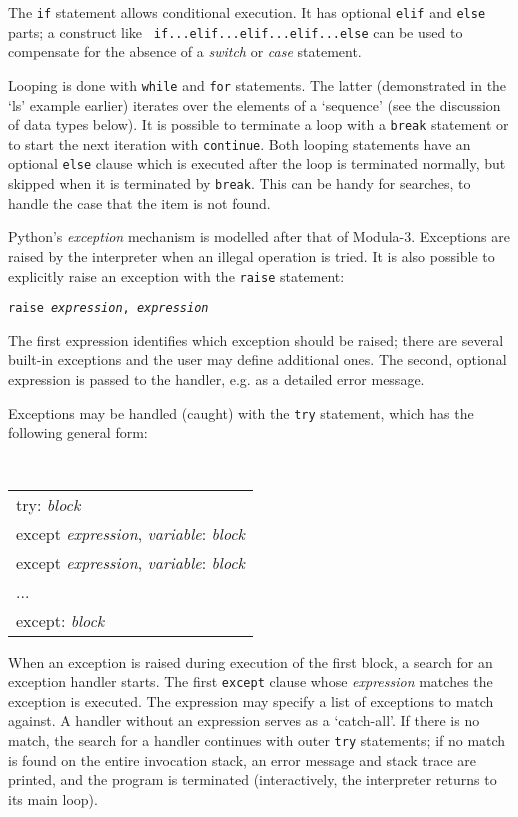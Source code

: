 The {\tt if} statement allows conditional execution.  It has optional
{\tt elif} and {\tt else} parts; a construct like {\tt
if...elif...elif...elif...else} can be used to compensate for the
absence of a {\em switch} or {\em case} statement.

Looping is done with {\tt while} and {\tt for} statements.  The latter
(demonstrated in the `ls' example earlier) iterates over the elements
of a `sequence' (see the discussion of data types below).  It is
possible to terminate a loop with a {\tt break} statement or to start
the next iteration with {\tt continue}.  Both looping statements have
an optional {\tt else} clause which is executed after the loop is
terminated normally, but skipped when it is terminated by {\tt break}.
This can be handy for searches, to handle the case that the item is
not found.

Python's {\em exception} mechanism is modelled after that of Modula-3.
Exceptions are raised by the interpreter when an illegal operation is
tried.  It is also possible to explicitly raise an exception with the
{\tt raise} statement:
\vspace{\itemsep}

\noindent
{\tt raise {\em expression}, {\em expression}}
\vspace{\itemsep}

The first expression identifies which exception should be raised;
there are several built-in exceptions and the user may define
additional ones.  The second, optional expression is passed to the
handler, e.g. as a detailed error message.

Exceptions may be handled (caught) with the {\tt try} statement, which
has the following general form:
\vspace{\itemsep}

\noindent
{\tt
\begin{tabular}{l}
try: {\em block} \\
except {\em expression}, {\em variable}: {\em block} \\
except {\em expression}, {\em variable}: {\em block} \\
... \\
except: {\em block}
\end{tabular}
}
\vspace{\itemsep}

When an exception is raised during execution of the first block, a
search for an exception handler starts.  The first {\tt except} clause
whose {\em expression} matches the exception is executed.  The
expression may specify a list of exceptions to match against.  A
handler without an expression serves as a `catch-all'.  If there is no
match, the search for a handler continues with outer {\tt try}
statements; if no match is found on the entire invocation stack, an
error message and stack trace are printed, and the program is
terminated (interactively, the interpreter returns to its main loop).


